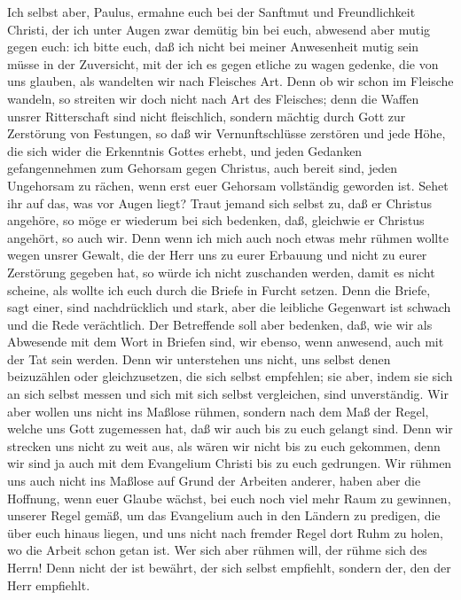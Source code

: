  Ich selbst aber, Paulus, ermahne euch bei der Sanftmut
und Freundlichkeit Christi, der ich unter Augen zwar demütig bin bei
euch, abwesend aber mutig gegen euch:  ich bitte euch, daß
ich nicht bei meiner Anwesenheit mutig sein müsse in der Zuversicht, mit
der ich es gegen etliche zu wagen gedenke, die von uns glauben, als
wandelten wir nach Fleisches Art.  Denn ob wir schon im
Fleische wandeln, so streiten wir doch nicht nach Art des Fleisches;
 denn die Waffen unsrer Ritterschaft sind nicht
fleischlich, sondern mächtig durch Gott zur Zerstörung von Festungen, so
daß wir Vernunftschlüsse zerstören  und jede Höhe, die
sich wider die Erkenntnis Gottes erhebt, und jeden Gedanken
gefangennehmen zum Gehorsam gegen Christus,  auch bereit
sind, jeden Ungehorsam zu rächen, wenn erst euer Gehorsam vollständig
geworden ist.  Sehet ihr auf das, was vor Augen liegt?
Traut jemand sich selbst zu, daß er Christus angehöre, so möge er
wiederum bei sich bedenken, daß, gleichwie er Christus angehört, so auch
wir.  Denn wenn ich mich auch noch etwas mehr rühmen
wollte wegen unsrer Gewalt, die der Herr uns zu eurer Erbauung und nicht
zu eurer Zerstörung gegeben hat, so würde ich nicht zuschanden werden,
 damit es nicht scheine, als wollte ich euch durch die
Briefe in Furcht setzen.  Denn die Briefe, sagt einer,
sind nachdrücklich und stark, aber die leibliche Gegenwart ist schwach
und die Rede verächtlich.  Der Betreffende soll aber
bedenken, daß, wie wir als Abwesende mit dem Wort in Briefen sind, wir
ebenso, wenn anwesend, auch mit der Tat sein werden. 
Denn wir unterstehen uns nicht, uns selbst denen beizuzählen oder
gleichzusetzen, die sich selbst empfehlen; sie aber, indem sie sich an
sich selbst messen und sich mit sich selbst vergleichen, sind
unverständig.  Wir aber wollen uns nicht ins Maßlose
rühmen, sondern nach dem Maß der Regel, welche uns Gott zugemessen hat,
daß wir auch bis zu euch gelangt sind.  Denn wir strecken
uns nicht zu weit aus, als wären wir nicht bis zu euch gekommen, denn
wir sind ja auch mit dem Evangelium Christi bis zu euch gedrungen.
 Wir rühmen uns auch nicht ins Maßlose auf Grund der
Arbeiten anderer, haben aber die Hoffnung, wenn euer Glaube wächst, bei
euch noch viel mehr Raum zu gewinnen, unserer Regel gemäß,
 um das Evangelium auch in den Ländern zu predigen, die
über euch hinaus liegen, und uns nicht nach fremder Regel dort Ruhm zu
holen, wo die Arbeit schon getan ist.  Wer sich aber
rühmen will, der rühme sich des Herrn!  Denn nicht der
ist bewährt, der sich selbst empfiehlt, sondern der, den der Herr
empfiehlt.

